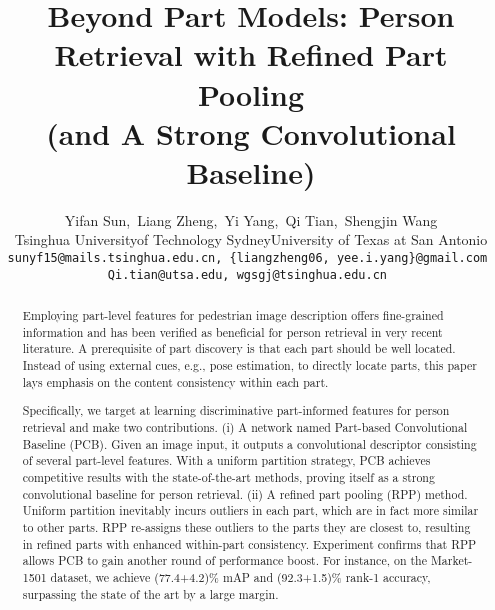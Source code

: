 \documentclass[10pt,twocolumn,letterpaper]{article}
\begin{document}
\title{Beyond Part Models: Person Retrieval with Refined Part Pooling\\ (and A Strong Convolutional Baseline)}
\author{Yifan Sun,\ Liang Zheng,\ Yi Yang,\ Qi Tian,\ Shengjin Wang \\
 Tsinghua University\quadUniversity of Technology Sydney\quad University of Texas at San Antonio\\
{\tt\small sunyf15@mails.tsinghua.edu.cn, \{liangzheng06, yee.i.yang\}@gmail.com }\\
{\tt\small Qi.tian@utsa.edu, wgsgj@tsinghua.edu.cn }
}
\maketitle


\begin{abstract}
Employing part-level features for pedestrian image description offers fine-grained information and has been verified as beneficial for person retrieval in very recent literature. A prerequisite of part discovery is that each part should be well located. Instead of using external cues, e.g.,  pose estimation, to directly locate parts, this paper lays emphasis on the content consistency within each part.

Specifically, we target at learning discriminative part-informed features for person retrieval and make two contributions. (i) A  network named Part-based Convolutional Baseline (PCB). Given an image input, it outputs a convolutional descriptor consisting of several part-level features. With a uniform partition strategy, PCB achieves competitive results with the state-of-the-art methods, 
proving itself as a strong convolutional baseline for person retrieval.
 (ii) A refined part pooling (RPP) method. Uniform partition inevitably incurs outliers in each part, which are in fact more similar to other parts. RPP re-assigns these outliers to the parts they are closest to, resulting in refined parts with enhanced within-part consistency. 
Experiment confirms that RPP allows PCB to gain another round of performance boost. For instance, on the Market-1501 dataset, we achieve (77.4+4.2)\% mAP and (92.3+1.5)\% rank-1 accuracy, surpassing the state of the art by a large margin. 


\end{abstract}
\end{document}
